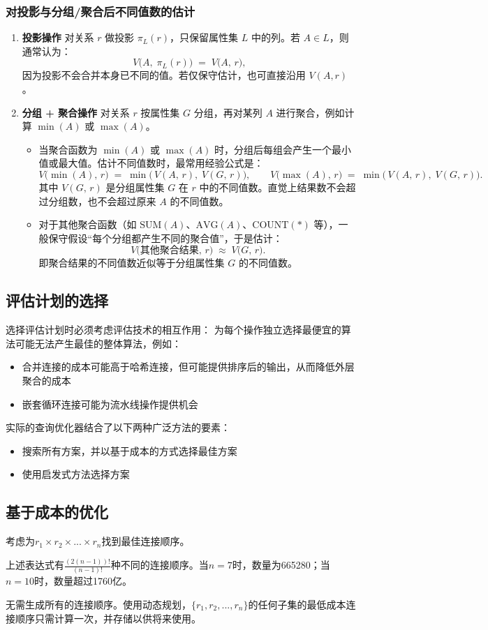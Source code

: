 \subsubsection{对投影与分组/聚合后不同值数的估计}
\begin{enumerate}
  \item \textbf{投影操作}  
    对关系 $r$ 做投影 $\pi_{L}(r)$，只保留属性集 $L$ 中的列。若 $A\in L$，则通常认为：
    \[
    V\bigl(A,\;\pi_{L}(r)\bigr)
    \;=\; 
    V\bigl(A,\,r\bigr),
    \]
    因为投影不会合并本身已不同的值。若仅保守估计，也可直接沿用 $V(A,r)$。

  \item \textbf{分组 + 聚合操作}  
    对关系 $r$ 按属性集 $G$ 分组，再对某列 $A$ 进行聚合，例如计算 $\min(A)$ 或 $\max(A)$。  
    \begin{itemize}
      \item 当聚合函数为 $\min(A)$ 或 $\max(A)$ 时，分组后每组会产生一个最小值或最大值。估计不同值数时，最常用经验公式是：
        \[
        V\bigl(\min(A),\,r\bigr)
        \;=\;
        \min\bigl(\,V(A,\,r),\;V(G,\,r)\bigr),
        \qquad
        V\bigl(\max(A),\,r\bigr)
        \;=\;
        \min\bigl(\,V(A,\,r),\;V(G,\,r)\bigr).
        \]
        其中 $V(G,\,r)$ 是分组属性集 $G$ 在 $r$ 中的不同值数。直觉上结果数不会超过分组数，也不会超过原来 $A$ 的不同值数。
      \item 对于其他聚合函数（如 $\mathrm{SUM}(A)$、$\mathrm{AVG}(A)$、$\mathrm{COUNT}(*)$ 等），一般保守假设“每个分组都产生不同的聚合值”，于是估计：
        \[
        V\bigl(\text{其他聚合结果},\,r\bigr)
        \;\approx\;
        V\bigl(G,\,r\bigr).
        \]
        即聚合结果的不同值数近似等于分组属性集 $G$ 的不同值数。
    \end{itemize}
\end{enumerate}

\subsection{评估计划的选择}

选择评估计划时必须考虑评估技术的相互作用：
为每个操作独立选择最便宜的算法可能无法产生最佳的整体算法，例如：
\begin{itemize}
    \item 合并连接的成本可能高于哈希连接，但可能提供排序后的输出，从而降低外层聚合的成本
    \item 嵌套循环连接可能为流水线操作提供机会
\end{itemize}

实际的查询优化器结合了以下两种广泛方法的要素：
\begin{itemize}
    \item 搜索所有方案，并以基于成本的方式选择最佳方案
    \item 使用启发式方法选择方案
\end{itemize}

\subsection{基于成本的优化}

考虑为$r_1\times r_2\times ...\times r_n$找到最佳连接顺序。

上述表达式有$\frac{(2(n-1))!}{(n-1)!}$种不同的连接顺序。当$n=7$时，数量为665280；当$n=10$时，数量超过1760亿。

无需生成所有的连接顺序。使用动态规划，$\{r_1,r_2,...,r_n\}$的任何子集的最低成本连接顺序只需计算一次，并存储以供将来使用。